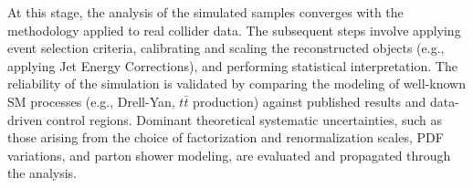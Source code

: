 At this stage, the analysis of the simulated samples converges with the methodology applied to real collider data. The subsequent steps involve applying event selection criteria, calibrating and scaling the reconstructed objects (e.g., applying Jet Energy Corrections), and performing statistical interpretation. The reliability of the simulation is validated by comparing the modeling of well-known SM processes (e.g., Drell-Yan, $t\bar{t}$ production) against published results and data-driven control regions. Dominant theoretical systematic uncertainties, such as those arising from the choice of factorization and renormalization scales, PDF variations, and parton shower modeling, are evaluated and propagated through the analysis.

